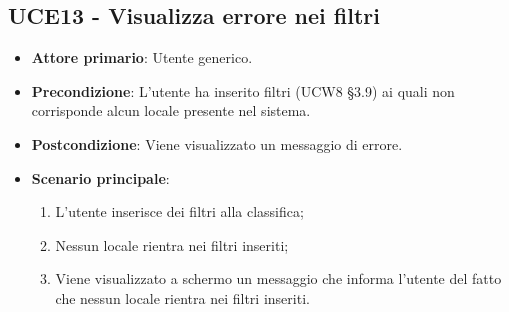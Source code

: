 \subsection{UCE13 - Visualizza errore nei filtri}
\begin{itemize}
    \item \textbf{Attore primario}: Utente generico.
    \item \textbf{Precondizione}: L'utente ha inserito filtri (UCW8 §3.9) ai quali non corrisponde alcun locale presente nel sistema.
    \item \textbf{Postcondizione}: Viene visualizzato un messaggio di errore.
    \item \textbf{Scenario principale}: 
    \begin{enumerate}
        \item L'utente inserisce dei filtri alla classifica;
        \item Nessun locale rientra nei filtri inseriti;
        \item Viene visualizzato a schermo un messaggio che informa l'utente del fatto che nessun locale rientra nei filtri inseriti.
    \end{enumerate}
\end{itemize}